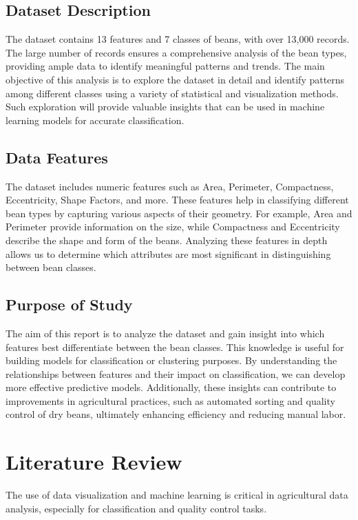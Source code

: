 \documentclass[a4paper,12pt]{article}
\begin{document}
\subsection{Dataset Description}
The dataset contains 13 features and 7 classes of beans, with over 13,000 records. The large number of records ensures a comprehensive analysis of the bean types, providing ample data to identify meaningful patterns and trends. The main objective of this analysis is to explore the dataset in detail and identify patterns among different classes using a variety of statistical and visualization methods. Such exploration will provide valuable insights that can be used in machine learning models for accurate classification.

\subsection{Data Features}
The dataset includes numeric features such as Area, Perimeter, Compactness, Eccentricity, Shape Factors, and more. These features help in classifying different bean types by capturing various aspects of their geometry. For example, Area and Perimeter provide information on the size, while Compactness and Eccentricity describe the shape and form of the beans. Analyzing these features in depth allows us to determine which attributes are most significant in distinguishing between bean classes.

\subsection{Purpose of Study}
The aim of this report is to analyze the dataset and gain insight into which features best differentiate between the bean classes. This knowledge is useful for building models for classification or clustering purposes. By understanding the relationships between features and their impact on classification, we can develop more effective predictive models. Additionally, these insights can contribute to improvements in agricultural practices, such as automated sorting and quality control of dry beans, ultimately enhancing efficiency and reducing manual labor.


\newpage
\section{Literature Review}

The use of data visualization and machine learning is critical in agricultural data analysis, especially for classification and quality control tasks.
\end{document}
